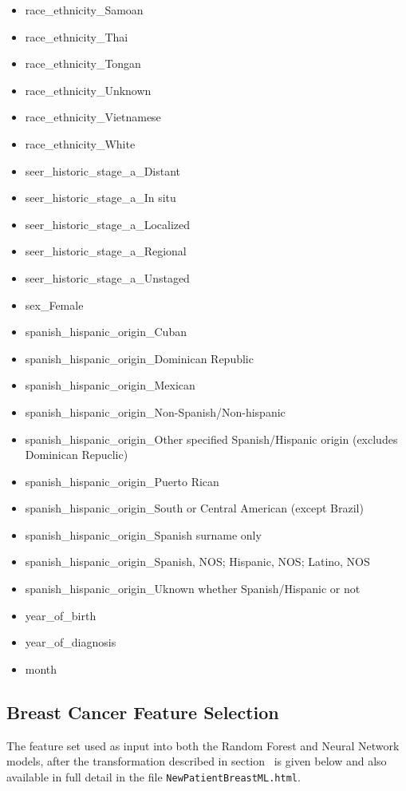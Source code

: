 \documentclass[10pt,letterpaper]{article}
\newcommand{\codewhite}[1]{\colorbox{white}{\texttt{#1}}}
\begin{document}
\begin{itemize}[noitemsep]
\item race\_ethnicity\_Samoan
\item race\_ethnicity\_Thai
\item race\_ethnicity\_Tongan
\item race\_ethnicity\_Unknown
\item race\_ethnicity\_Vietnamese
\item race\_ethnicity\_White
\item seer\_historic\_stage\_a\_Distant
\item seer\_historic\_stage\_a\_In situ
\item seer\_historic\_stage\_a\_Localized
\item seer\_historic\_stage\_a\_Regional
\item seer\_historic\_stage\_a\_Unstaged
\item sex\_Female
\item spanish\_hispanic\_origin\_Cuban
\item spanish\_hispanic\_origin\_Dominican Republic
\item spanish\_hispanic\_origin\_Mexican
\item spanish\_hispanic\_origin\_Non-Spanish/Non-hispanic
\item spanish\_hispanic\_origin\_Other specified Spanish/Hispanic origin (excludes Dominican Repuclic)
\item spanish\_hispanic\_origin\_Puerto Rican
\item spanish\_hispanic\_origin\_South or Central American (except Brazil)
\item spanish\_hispanic\_origin\_Spanish surname only
\item spanish\_hispanic\_origin\_Spanish, NOS; Hispanic, NOS; Latino, NOS
\item spanish\_hispanic\_origin\_Uknown whether Spanish/Hispanic or not
\item year\_of\_birth
\item year\_of\_diagnosis
\item month
\end{itemize}

\subsection*{Breast Cancer Feature Selection}
\label{Breast_Cancer_Feature_Selection}

The feature set used as input into both the Random Forest and Neural Network models, after the transformation described in section~ is given below and also available in full detail in the file 
\codewhite{NewPatientBreastML.html}.
\end{document}
